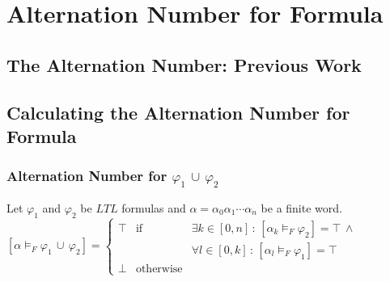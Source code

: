 \chapter{Alternation Number for \LTL Formula}


\section{The Alternation Number: Previous Work}

\section{Calculating the Alternation Number for \LTL Formula}
\label{sec:AN}


\subsection{Alternation Number for $\varphi_1 \, \cup \, \varphi_2$}

\begin{definition}

 Let  $\varphi_1$ and $\varphi_2$ be $LTL$ formulas and $\alpha = 
\alpha_0\alpha_1\cdots \alpha_{n}$ be a finite word.\\

$   [ \alpha \models_F \varphi_1 \, \cup \, \varphi_2] =  \left\{ \begin{array}{rcl} \top & \mbox{if}
         & \exists k \in [0,n] \, : \, [\alpha_k \models_F \varphi_2] = \top\, \wedge \, \\& \mbox{} & \mbox{} \forall l \in [0,k] \, : \, [\alpha_l \models_F \varphi_1] = \top  \\ \bot  & \mbox{otherwise} \end{array}\right. $ 

\end{definition}
~~~




